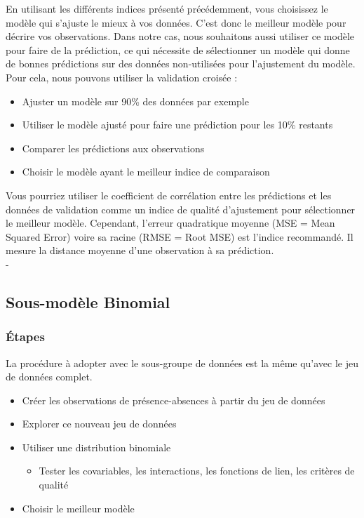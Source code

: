 \documentclass[french,a4paper]{article}
\providecommand{\tightlist}{%
  \setlength{\itemsep}{0pt}\setlength{\parskip}{0pt}}
\begin{document}
En utilisant les différents indices présenté précédemment, vous choisissez le modèle qui s'ajuste le mieux à vos données. C'est donc le meilleur modèle pour décrire vos observations. Dans notre cas, nous souhaitons aussi utiliser ce modèle pour faire de la prédiction, ce qui nécessite de sélectionner un modèle qui donne de bonnes prédictions sur des données non-utilisées pour l'ajustement du modèle. Pour cela, nous pouvons utiliser la validation croisée :

\begin{itemize}
\tightlist
\item
  Ajuster un modèle sur 90\% des données par exemple
\item
  Utiliser le modèle ajusté pour faire une prédiction pour les 10\% restants
\item
  Comparer les prédictions aux observations
\item
  Choisir le modèle ayant le meilleur indice de comparaison
\end{itemize}

Vous pourriez utiliser le coefficient de corrélation entre les prédictions et les données de validation comme un indice de qualité d'ajustement pour sélectionner le meilleur modèle. Cependant, l'erreur quadratique moyenne (MSE = Mean Squared Error) voire sa racine (RMSE = Root MSE) est l'indice recommandé. Il mesure la distance moyenne d'une observation à sa prédiction.\\
- 

\hypertarget{sous-modele-binomial}{%
\subsection{Sous-modèle Binomial}\label{sous-modele-binomial}}

\hypertarget{etapes-2}{%
\subsubsection{Étapes}\label{etapes-2}}

La procédure à adopter avec le sous-groupe de données est la même qu'avec le jeu de données complet.

\begin{itemize}
\tightlist
\item
  Créer les observations de présence-absences à partir du jeu de données
\item
  Explorer ce nouveau jeu de données
\item
  Utiliser une distribution binomiale

  \begin{itemize}
  \tightlist
  \item
    Tester les covariables, les interactions, les fonctions de lien, les critères de qualité
  \end{itemize}
\item
  Choisir le meilleur modèle
\end{itemize}
\end{document}
